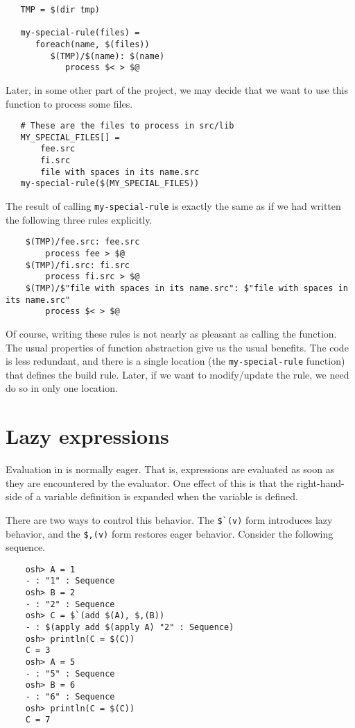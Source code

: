 \begin{verbatim}
   TMP = $(dir tmp)

   my-special-rule(files) =
      foreach(name, $(files))
         $(TMP)/$(name): $(name)
            process $< > $@
\end{verbatim}

Later, in some other part of the project, we may decide that we want to use this function to process some files.

\begin{verbatim}
   # These are the files to process in src/lib
   MY_SPECIAL_FILES[] =
       fee.src
       fi.src
       file with spaces in its name.src
   my-special-rule($(MY_SPECIAL_FILES))
\end{verbatim}

The result of calling \verb+my-special-rule+ is
exactly the same as if we had written the following three rules explicitly.

\begin{verbatim}
    $(TMP)/fee.src: fee.src
        process fee > $@
    $(TMP)/fi.src: fi.src
        process fi.src > $@
    $(TMP)/$"file with spaces in its name.src": $"file with spaces in its name.src"
        process $< > $@
\end{verbatim}

Of course, writing these rules is not nearly as pleasant as calling the function.  The usual
properties of function abstraction give us the usual benefits.  The code is less redundant, and
there is a single location (the \verb+my-special-rule+ function) that defines the build rule.
Later, if we want to modify/update the rule, we need do so in only one location.

\section{Lazy expressions}
\label{section:lazy}

Evaluation in  is normally eager.  That is, expressions
are evaluated as soon as they are encountered by the evaluator.  One effect
of this is that the right-hand-side of a variable definition is expanded
when the variable is defined.

There are two ways to control this behavior.  The \verb+$`(v)+ form
introduces lazy behavior, and the \verb+$,(v)+ form restores
eager behavior.  Consider the following sequence.

\begin{verbatim}
    osh> A = 1
    - : "1" : Sequence
    osh> B = 2
    - : "2" : Sequence
    osh> C = $`(add $(A), $,(B))
    - : $(apply add $(apply A) "2" : Sequence)
    osh> println(C = $(C))
    C = 3
    osh> A = 5
    - : "5" : Sequence
    osh> B = 6
    - : "6" : Sequence
    osh> println(C = $(C))
    C = 7
\end{verbatim}

